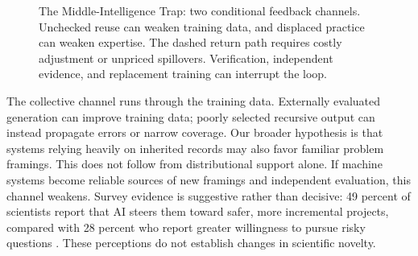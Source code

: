 \documentclass[12pt]{article}
\theoremstyle{plain}
\theoremstyle{definition}
\theoremstyle{remark}
\begin{document}
\begin{figure}[t]
\centering
{}
\caption{The Middle-Intelligence Trap: two conditional feedback channels.
Unchecked reuse can weaken training data, and displaced practice can
weaken expertise. The dashed return path requires costly adjustment or
unpriced spillovers. Verification, independent evidence, and replacement
training can interrupt the loop.}
\label{fig:trap}
\end{figure}

The collective channel runs through the training data. Externally evaluated generation can
improve training data; poorly selected recursive output can instead
propagate errors or narrow coverage. Our broader hypothesis is that
systems relying heavily on inherited records may also favor familiar
problem framings. This does not follow from distributional support
alone. If machine systems become reliable sources of new framings and
independent evaluation, this channel weakens. Survey evidence is
suggestive rather than decisive: 49 percent of scientists report that
AI steers them toward safer, more incremental projects, compared with
28 percent who report greater willingness to pursue risky questions
\citep{CodreanuEtAl2026AIScience}. These perceptions do not establish
changes in scientific novelty.
\end{document}
